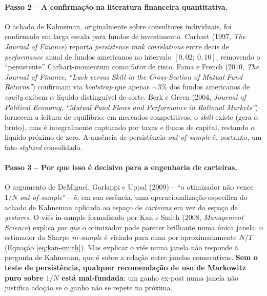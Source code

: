 \documentclass[12pt,a4paper,oneside]{article}
\begin{document}
\paragraph{Passo 2 -- A confirmação na literatura financeira
quantitativa.}
O achado de Kahneman, originalmente sobre consultores individuais,
foi confirmado em larga escala para fundos de investimento. Carhart
(1997, \textit{The Journal of Finance}) reporta \textit{persistence
rank correlations} entre decis de \textit{performance} anual de
fundos americanos no intervalo $[0{,}02;\ 0{,}10]$, removendo o
``persistente'' Carhart-momentum como fator de risco. Fama e French
(2010, \textit{The Journal of Finance}, \textit{``Luck versus Skill
in the Cross-Section of Mutual Fund Returns''}) confirmam via
\textit{bootstrap} que apenas $\sim 3\%$ dos fundos americanos de
\textit{equity} exibem $\alpha$ líquido distinguível de sorte. Berk
e Green (2004, \textit{Journal of Political Economy},
\textit{``Mutual Fund Flows and Performance in Rational Markets''})
fornecem a leitura de equilíbrio: em mercados competitivos, o
\textit{skill} existe (gera $\alpha$ bruto), mas é integralmente
capturado por taxas e fluxos de capital, restando $\alpha$ líquido
próximo de zero. A ausência de persistência \textit{out-of-sample} é,
portanto, um fato \textit{stylized} consolidado.

\paragraph{Passo 3 -- Por que isso é decisivo para a engenharia de
carteiras.}
O argumento de DeMiguel, Garlappi e Uppal (2009) -- ``o otimizador
não vence $1/N$ \textit{out-of-sample}'' -- é, em sua essência, uma
operacionalização específica do achado de Kahneman aplicada ao espaço
de \textit{carteiras} em vez do espaço de \textit{gestores}. O viés
in-sample formalizado por Kan e Smith (2008, \textit{Management
Science}) explica \textit{por que} o otimizador pode parecer
brilhante numa única janela: o estimador do Sharpe \textit{in-sample}
é viciado para cima por aproximadamente $N/T$ (Equação
\ref{eq:kan-smith}). Mas explicar o viés numa janela não responde à
pergunta de Kahneman, que é sobre a relação entre janelas
consecutivas. \textbf{Sem o teste de persistência, qualquer
recomendação de uso de Markowitz puro sobre $1/N$ está mal-fundada}:
um ganho ex-post numa janela não justifica adoção se o ganho não se
repete na próxima.
\end{document}
